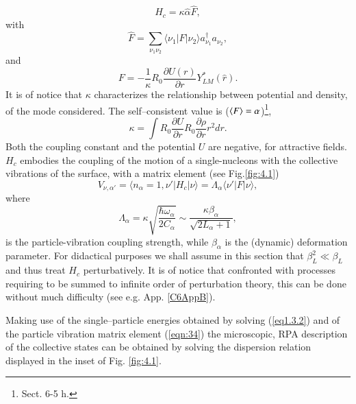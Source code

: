 \begin{equation}\label{eqintroD2}
H_{c} = \kappa \hat{\alpha} \hat{F} ,
\end{equation}
with
\begin{equation}
\hat{F} = \sum_{\nu_1 \nu_2} \langle \nu_1|F|\nu_2 \rangle a_{\nu_1}^{\dagger} a_{\nu_2} ,
\label{eqn:32}
\end{equation}
and
\begin{equation}
F = - \frac{1}{\kappa} R_0 \frac{\partial U(r)}{\partial r} Y_{LM}^* (\hat{r}) .
\label{eqn:33}
\end{equation}
It is of notice that $\kappa$ characterizes the relationship between potential and density, of the mode considered. The self--consistent value is ($\langle {F} \rangle=\alpha$)\footnote{\cite{Bohr:75} Sect. 6-5 h.}, 
\begin{equation}
\kappa=\int R_0\frac{\partial U}{\partial r}R_0\frac{\partial \rho}{\partial r}r^2dr.
\end{equation}
Both the coupling constant and the potential $U$ are negative, for attractive fields.
 $H_{c}$ embodies the coupling of the motion of a single-nucleons with the collective vibrations of the surface, with a matrix element (see Fig.\ref{fig:4.1})
\begin{equation}
V_{\nu,\alpha'}=\langle n_{\alpha} = 1, \nu' |H_{c}|\nu \rangle  = \Lambda_{\alpha} \langle \nu' |F|\nu \rangle ,
\label{eqn:34}
\end{equation}
where
\begin{equation}\label{eqintroD6}
\Lambda_{\alpha} = \kappa \sqrt{\frac{\hbar\omega_{\alpha}}{2C_{\alpha}}} \sim \frac{\kappa \beta_{\alpha}}{\sqrt{2L_{\alpha}+1}} ,
\end{equation}
is the particle-vibration coupling strength, while $\beta_\alpha$ is the (dynamic) deformation parameter. For didactical purposes we shall assume in this section that $\beta_L^2 \ll \beta_L$ and thus  treat  $H_{c}$ perturbatively. It is of notice that confronted with processes requiring to be summed to infinite order of perturbation theory, this can be done without much difficulty (see e.g. App. \ref{C6AppB}).

Making use of the single--particle energies obtained by solving (\ref{eq1.3.2}) and of the  particle vibration matrix element (\ref{eqn:34}) the microscopic, RPA description of the collective states can be obtained by solving the dispersion relation displayed in the inset of Fig. \ref{fig:4.1}.

